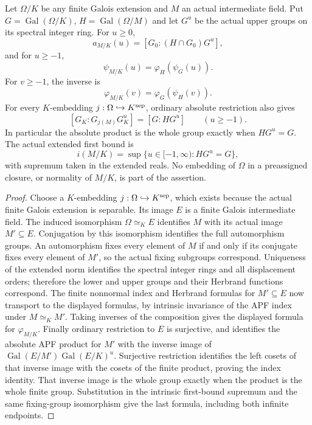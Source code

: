 \begin{lemma}
\label{fw:finite-galois-overfield-apf}
\leanok
Let $\Omega/K$ be any finite Galois extension and $M$ an actual
intermediate field. Put $G=\operatorname{Gal}(\Omega/K)$,
$H=\operatorname{Gal}(\Omega/M)$ and let $G^u$ be the actual
upper groups on its spectral integer ring. For $u\geq0$,
\[
 a_{M/K}(u)=[G_0:(H\cap G_0)G^u],
\]
and for $u\geq-1$,
\[
 \psi_{M/K}(u)=\varphi_H(\psi_G(u)).
\]
For $v\geq-1$, the inverse is
\[
 \varphi_{M/K}(v)=\varphi_G(\psi_H(v)).
\]
For every $K$-embedding $j:\Omega\hookrightarrow K^{\rm sep}$,
ordinary absolute restriction also gives
\[
 [G_K:G_{j(M)}G_K^u]=[G:HG^u]\qquad(u\geq-1).
\]
In particular the absolute product is the whole group exactly
when $HG^u=G$. The actual extended first bound is
\[
 i(M/K)=\sup\{u\in[-1,\infty):HG^u=G\},
\]
with supremum taken in the extended reals. No embedding of
$\Omega$ in a preassigned closure, or normality of $M/K$, is
part of the assertion.
\end{lemma}
\begin{proof}
Choose a $K$-embedding $j:\Omega\hookrightarrow K^{\rm sep}$,
which exists because the actual finite Galois extension is
separable. Its image $E$ is a finite Galois intermediate field.
The induced isomorphism $\Omega\simeq_K E$ identifies $M$
with its actual image $M'\subseteq E$. Conjugation by this
isomorphism identifies the full automorphism groups. An
automorphism fixes every element of $M$ if and only if its
conjugate fixes every element of $M'$, so the actual fixing
subgroups correspond. Uniqueness of the extended norm identifies
the spectral integer rings and all displacement orders; therefore
the lower and upper groups and their Herbrand functions correspond.
The finite nonnormal index and Herbrand formulas for $M'\subseteq E$
now transport to the displayed formulas, by intrinsic invariance
of the APF index under $M\simeq_K M'$. Taking inverses of the
composition gives the displayed formula for $\varphi_{M/K}$.
Finally ordinary restriction to $E$ is surjective, and identifies
the absolute APF product for $M'$ with the inverse image of
$\operatorname{Gal}(E/M')\operatorname{Gal}(E/K)^u$.
Surjective restriction identifies the left cosets of that inverse
image with the cosets of the finite product, proving the index
identity. That inverse image is the whole group exactly when the
product is the whole finite group. Substitution in the intrinsic
first-bound supremum and the same fixing-group isomorphism give
the last formula, including both infinite endpoints.
\end{proof}

